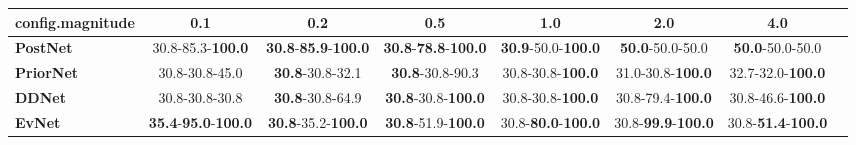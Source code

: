 \begin{tabular}{lccccccc}
\toprule
\textbf{config.magnitude} &                                         0.1 &                                         0.2 &                                         0.5 &                                1.0 &                                2.0 &                                4.0 \\
\midrule
\textbf{PostNet } &                    30.8-85.3-\textbf{100.0} &  \textbf{30.8}-\textbf{85.9}-\textbf{100.0} &  \textbf{30.8}-\textbf{78.8}-\textbf{100.0} &  \textbf{30.9}-50.0-\textbf{100.0} &            \textbf{50.0}-50.0-50.0 &            \textbf{50.0}-50.0-50.0 \\
\textbf{PriorNet} &                              30.8-30.8-45.0 &                     \textbf{30.8}-30.8-32.1 &                     \textbf{30.8}-30.8-90.3 &           30.8-30.8-\textbf{100.0} &           31.0-30.8-\textbf{100.0} &           32.7-32.0-\textbf{100.0} \\
\textbf{DDNet   } &                              30.8-30.8-30.8 &                     \textbf{30.8}-30.8-64.9 &           \textbf{30.8}-30.8-\textbf{100.0} &           30.8-30.8-\textbf{100.0} &           30.8-79.4-\textbf{100.0} &           30.8-46.6-\textbf{100.0} \\
\textbf{EvNet   } &  \textbf{35.4}-\textbf{95.0}-\textbf{100.0} &           \textbf{30.8}-35.2-\textbf{100.0} &           \textbf{30.8}-51.9-\textbf{100.0} &  30.8-\textbf{80.0}-\textbf{100.0} &  30.8-\textbf{99.9}-\textbf{100.0} &  30.8-\textbf{51.4}-\textbf{100.0} \\
\bottomrule
\end{tabular}
